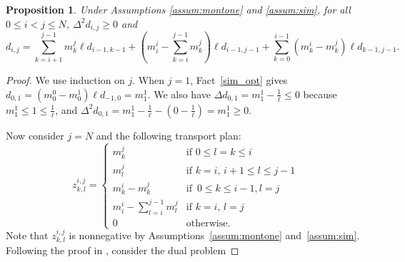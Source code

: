 \documentclass[pdflatex,sn-mathphys-num]{sn-jnl}%
\theoremstyle{thmstyleone}%
\newtheorem{proposition}[theorem]{Proposition}%
\theoremstyle{thmstyletwo}%
\theoremstyle{thmstylethree}%
\begin{document}
\begin{proposition}\label{lem:sim}
    Under Assumptions \ref{assum:montone} and \ref{assum:sim},  for all $0 \le i<j\le N$, $\Delta^2 d_{i,j} \ge 0$ and
    \[d_{i,j} = \sum^{j-1}_{k=i+1}m^j_k \ell d_{i-1,k-1}+(m^i_i-\sum^{j-1}_{k=i}m^j_k)\ell d_{i-1,j-1} +\sum^{i-1}_{k=0}(m^i_k-m^j_k) \ell d_{k-1,j-1} .\]
\end{proposition}
\begin{proof}
We use induction on $j$. When $j=1$, Fact~\ref{sim_opt} gives
$d_{0,1}=(m_0^0 - m_0^1)\ell d_{-1,0}=m_1^1$.
We also have $\Delta d_{0,1}=m_1^1-\frac{1}{\ell}\le 0$ because
$m_1^1\le 1\le\frac{1}{\ell}$, and
$\Delta^2 d_{0,1}=m_1^1-\frac{1}{\ell}
-(0-\frac{1}{\ell})=m_1^1\ge 0$.

Now consider $j=N$ and the following transport plan:
\[
 z^{i,j}_{k,l}
=
\begin{cases}
\displaystyle
m^j_k
&\text{if } 0 \le l=k \le i \\[10pt]


\displaystyle
m^j_l
&\text{if } k=i,\, i+1 \le l \le j-1\\[10pt]

m^i_k-m^j_k
&\text{if }   \, 0 \le k \le i-1, l=j \\[10pt]

m^i_i-\sum^{j-1}_{l=i}m^j_l
&\text{if }  k=i, \, l=j \\[10pt]

0
& \text{otherwise.}
\end{cases}
\]
Note that $z^{i,j}_{k,l}$ is nonnegative by Assumptions~\ref{assum:montone} and~\ref{assum:sim}. Following the proof in \cite{cc2023}, consider the dual problem


\end{proof}
\end{document}
